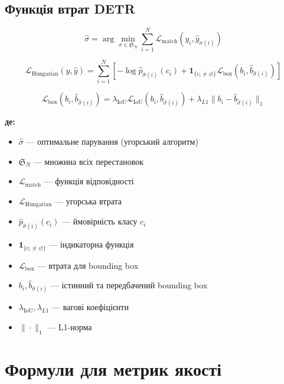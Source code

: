 \documentclass[14pt, a4paper]{extarticle}
\numberwithin{equation}{section}
\begin{document}
\subsection{Функція втрат DETR}

\begin{equation}
\boxed{\hat{\sigma} = \arg\min_{\sigma \in \mathfrak{S}_N} \sum_{i=1}^N \mathcal{L}_{\text{match}}(y_i, \hat{y}_{\sigma(i)})} \tag{60}
\end{equation}

\begin{equation}
\boxed{\mathcal{L}_{\text{Hungarian}}(y, \hat{y}) = \sum_{i=1}^N \left[ -\log \hat{p}_{\hat{\sigma}(i)}(c_i) + \mathbf{1}_{\{c_i \neq \varnothing\}} \mathcal{L}_{\text{box}}(b_i, \hat{b}_{\hat{\sigma}(i)}) \right]} \tag{61}
\end{equation}

\begin{equation}
\boxed{\mathcal{L}_{\text{box}}(b_i, \hat{b}_{\hat{\sigma}(i)}) = \lambda_{\text{IoU}} \mathcal{L}_{\text{IoU}}(b_i, \hat{b}_{\hat{\sigma}(i)}) + \lambda_{L1} \|b_i - \hat{b}_{\hat{\sigma}(i)}\|_1} \tag{62}
\end{equation}

\textbf{де:}
\begin{itemize}
\item $\hat{\sigma}$ — оптимальне парування (угорський алгоритм)
\item $\mathfrak{S}_N$ — множина всіх перестановок
\item $\mathcal{L}_{\text{match}}$ — функція відповідності
\item $\mathcal{L}_{\text{Hungarian}}$ — угорська втрата
\item $\hat{p}_{\hat{\sigma}(i)}(c_i)$ — ймовірність класу $c_i$
\item $\mathbf{1}_{\{c_i \neq \varnothing\}}$ — індикаторна функція
\item $\mathcal{L}_{\text{box}}$ — втрата для bounding box
\item $b_i, \hat{b}_{\hat{\sigma}(i)}$ — істинний та передбачений bounding box
\item $\lambda_{\text{IoU}}, \lambda_{L1}$ — вагові коефіцієнти
\item $\|\cdot\|_1$ — L1-норма
\end{itemize}

\newpage

\section{Формули для метрик якості}
\end{document}
